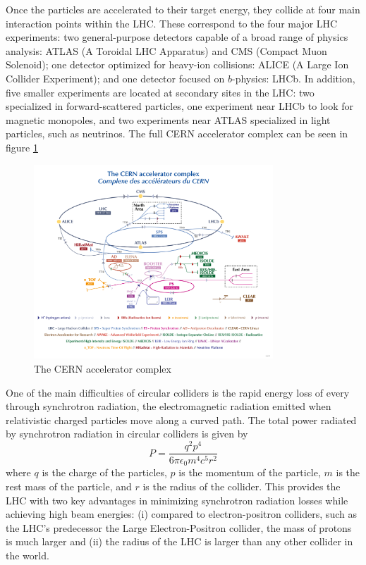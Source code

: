 Once the particles are accelerated to their target energy, they collide at four main interaction points within the LHC. These correspond to the four major LHC experiments: two general-purpose detectors capable of a broad range of physics analysis: ATLAS (A Toroidal LHC Apparatus) and CMS (Compact Muon Solenoid); one detector optimized for heavy-ion collisions: ALICE (A Large Ion Collider Experiment); and one detector focused on $b$-physics: LHCb. In addition, five smaller experiments are located at secondary sites in the LHC: two specialized in forward-scattered particles, one experiment near LHCb to look for magnetic monopoles, and two experiments near ATLAS specialized in light particles, such as neutrinos. The full CERN accelerator complex can be seen in figure \ref{fig:cern-accelerator-complex}

\begin{figure}[htbp]
    \centering
    \includegraphics[width=0.8\textwidth]{figures/chapter3/CERN-accelerator-complex.png}
    \caption{The CERN accelerator complex \cite{ref:Lopienska}}
    \label{fig:cern-accelerator-complex}
\end{figure}


One of the main difficulties of circular colliders is the rapid energy loss of every through synchrotron radiation, the electromagnetic radiation emitted when relativistic charged particles move along a curved path. The total power radiated by synchrotron radiation in circular colliders is given by
\begin{equation}
    P = \frac{q^2p^4}{6 \pi \epsilon_0 m^4 c^5 r^2}
\end{equation}
where $q$ is the charge of the particles, $p$ is the momentum of the particle, $m$ is the rest mass of the particle, and $r$ is the radius of the collider. This provides the LHC with two key advantages in minimizing synchrotron radiation losses while achieving high beam energies: (i) compared to electron-positron colliders, such as the LHC's predecessor the Large Electron-Positron collider, the mass of protons is much larger and (ii) the radius of the LHC is larger than any other collider in the world. 

